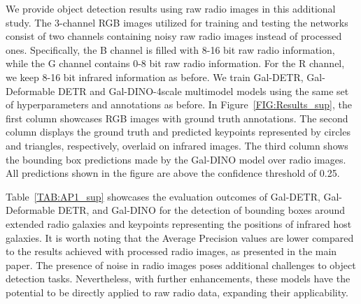 \documentclass[
  journal=pasa,
  manuscript=research-paper, %
  year=2020,
  volume=37,
]{cup-journal}
\begin{document}
We provide object detection results using raw radio images in this additional study.
The 3-channel RGB images utilized for training and testing the networks consist of two channels containing noisy raw radio images instead of processed ones. 
Specifically, the B channel is filled with 8-16 bit raw radio information, while the G channel contains 0-8 bit raw radio information.
For the R channel, we keep 8-16 bit infrared information as before.
We train Gal-DETR, Gal-Deformable DETR and Gal-DINO-4scale multimodel models using the same set of hyperparameters and annotations as before.
In Figure~\ref{FIG:Results_sup}, the first column showcases RGB images with ground truth annotations. The second column displays the ground truth and predicted keypoints represented by circles and triangles, respectively, overlaid on infrared images. The third column shows the bounding box predictions made by the Gal-DINO model over radio images. All predictions shown in the figure are above the confidence threshold of 0.25.

Table~\ref{TAB:AP1_sup} showcases the evaluation outcomes of Gal-DETR, Gal-Deformable DETR, and Gal-DINO for the detection of bounding boxes around extended radio galaxies and keypoints representing the positions of infrared host galaxies. 
It is worth noting that the Average Precision values are lower compared to the results achieved with processed radio images, as presented in the main paper. 
The presence of noise in radio images poses additional challenges to object detection tasks. 
Nevertheless, with further enhancements, these models have the potential to be directly applied to raw radio data, expanding their applicability.

\label{lastpage}
\end{document}
